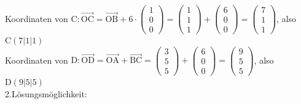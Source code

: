 \documentclass[10pt]{article}
\begin{document}
Koordinaten von $\mathrm{C}: \overrightarrow{\mathrm{OC}}=\overrightarrow{\mathrm{OB}}+6 \cdot\left(\begin{array}{l}1 \\ 0 \\ 0\end{array}\right)=\left(\begin{array}{l}1 \\ 1 \\ 1\end{array}\right)+\left(\begin{array}{l}6 \\ 0 \\ 0\end{array}\right)=\left(\begin{array}{l}7 \\ 1 \\ 1\end{array}\right)$, also $\mathrm{C}(7|1| 1)$\\
Koordinaten von $\mathrm{D}: \overrightarrow{\mathrm{OD}}=\overrightarrow{\mathrm{OA}}+\overrightarrow{\mathrm{BC}}=\left(\begin{array}{l}3 \\ 5 \\ 5\end{array}\right)+\left(\begin{array}{l}6 \\ 0 \\ 0\end{array}\right)=\left(\begin{array}{l}9 \\ 5 \\ 5\end{array}\right)$, also $\mathrm{D}(9|5| 5)$\\
2.Lösungsmöglichkeit:
\end{document}
